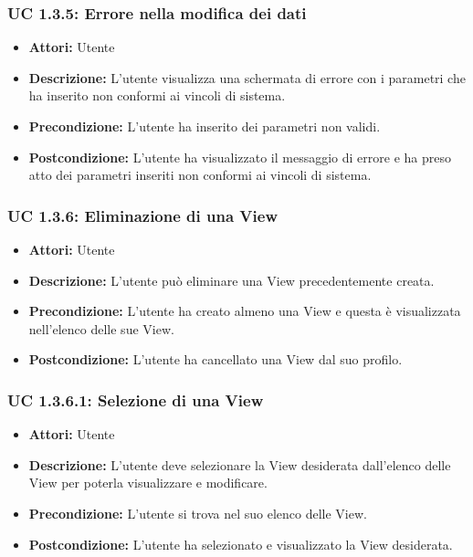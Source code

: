 \subsubsection{UC 1.3.5: Errore nella modifica dei dati}

\begin{itemize}
\item \textbf{Attori:} Utente
\item \textbf{Descrizione:} L'utente visualizza una schermata di errore con i parametri che ha inserito non conformi ai vincoli di sistema.
\item \textbf{Precondizione:} L'utente ha inserito dei parametri non validi.
\item \textbf{Postcondizione:} L'utente ha visualizzato il messaggio di errore e ha preso atto dei parametri inseriti non conformi ai vincoli di sistema.
\end{itemize}

\subsubsection{UC 1.3.6: Eliminazione di una View}

\begin{itemize}
\item \textbf{Attori:} Utente
\item \textbf{Descrizione:} L'utente può eliminare una View precedentemente creata.
\item \textbf{Precondizione:} L'utente ha creato almeno una View e questa è visualizzata nell'elenco delle sue View.
\item \textbf{Postcondizione:} L'utente ha cancellato una View dal suo profilo.
\end{itemize}

\subsubsection{UC 1.3.6.1: Selezione di una View}

\begin{itemize}
\item \textbf{Attori:} Utente
\item \textbf{Descrizione:} L'utente deve selezionare la View desiderata dall'elenco delle View per poterla visualizzare e modificare.
\item \textbf{Precondizione:} L'utente si trova nel suo elenco delle View.
\item \textbf{Postcondizione:} L'utente ha selezionato e visualizzato la View desiderata.
\end{itemize}

